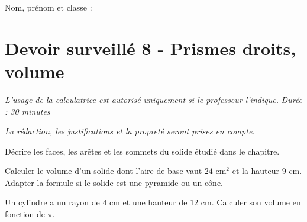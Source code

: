 \documentclass[a4paper,10pt]{report}
\begin{document}
\pagestyle{empty}
\noindent Nom, prénom et classe : \dotfill

\section*{Devoir surveillé 8 - Prismes droits, volume}

\noindent \textit{L'usage de la calculatrice est autorisé uniquement si le professeur l'indique.} \hfill \textit{Durée : 30 minutes}

\medskip
\noindent \textit{La rédaction, les justifications et la propreté seront prises en compte.}


\begin{ex}[Vocabulaire]
Décrire les faces, les arêtes et les sommets du solide étudié dans le chapitre.
\medskip\noindent\grandscarreaux{\linewidth}{3cm}
\end{ex}
\begin{ex}[Volume]
Calculer le volume d'un solide dont l'aire de base vaut $24$ cm$^2$ et la hauteur $9$ cm. Adapter la formule si le solide est une pyramide ou un cône.
\medskip\noindent\grandscarreaux{\linewidth}{4cm}
\end{ex}
\begin{ex}[Problème]
Un cylindre a un rayon de $4$ cm et une hauteur de $12$ cm. Calculer son volume en fonction de $\pi$.
\medskip\noindent\grandscarreaux{\linewidth}{4cm}
\end{ex}
\end{document}
